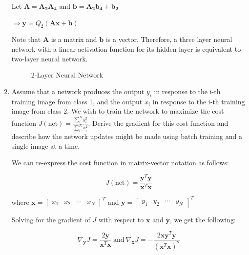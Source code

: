 \documentclass[fleqn]{article}
\begin{document}
\begin{enumerate}
		Let $\mathbf{A} = \mathbf{A_2}\mathbf{A_4}$ and $\mathbf{b} = \mathbf{A_2}\mathbf{b_4} + \mathbf{b_2}$
		
		$\Rightarrow \mathbf{y} = Q_2(\mathbf{A}\mathbf{x} + \mathbf{b})$
		
		Note that $\mathbf{A}$ is a matrix and $\mathbf{b}$ is a vector. Therefore, a three layer neural network with a linear activation function for its hidden layer is equivalent to two-layer neural network.
		
		\begin{figure}[H]
			\centerline{}
			\caption{2-Layer Neural Network}
			\label{neural_network_2_layer}
		\end{figure}
		
		\item Assume that a network produces the output $y_i$ in response to the i-th training image from class 1, and the output $x_i$ in response to the i-th training image from class 2. We wish to train the network to maximize the cost function $J(\text{net}) = \frac{\sum_{i}^{N}{y_i^2}}{\sum_{i}^{N}{x_i^2}}$. Derive the gradient for this cost function and describe how the network updates might be made using batch training and a single image at a time.
		
		We can re-express the cost function in matrix-vector notation as follows:
		
		\begin{equation*}
			J(\text{net}) = \frac{\mathbf{y}^T\mathbf{y}}{\mathbf{x}^T\mathbf{x}}
		\end{equation*}
		
		where $\mathbf{x} = \begin{bmatrix}x_1 & x_2 & \cdots & x_N \end{bmatrix}^T$ and $\mathbf{y} = \begin{bmatrix}y_1 & y_2 & \cdots & y_N \end{bmatrix}^T$
		
		Solving for the gradient of $J$ with respect to $\mathbf{x}$ and $\mathbf{y}$, we get the following: 
		
		\begin{equation*}
			\nabla_{\mathbf{y}}{J} = \frac{2\mathbf{y}}{\mathbf{x}^T\mathbf{x}} \ \text{and}\ \nabla_{\mathbf{x}}{J} = -\frac{2\mathbf{x}\mathbf{y}^T\mathbf{y}}{(\mathbf{x}^T\mathbf{x})^2}
		\end{equation*}		
		

\end{enumerate}
\end{document}
